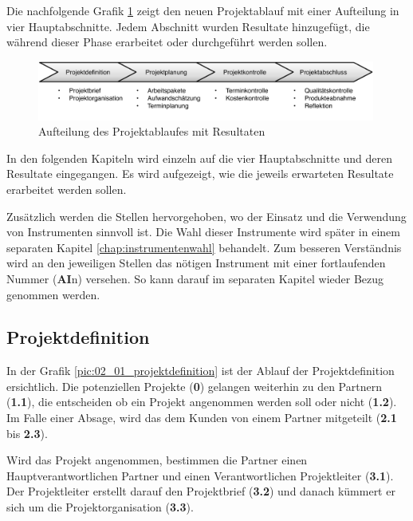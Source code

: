 Die nachfolgende Grafik \ref{pic:01_projektablauf} zeigt den neuen Projektablauf 
mit einer Aufteilung in vier Hauptabschnitte. Jedem Abschnitt wurden Resultate
hinzugefügt, die während dieser Phase erarbeitet oder durchgeführt werden sollen.

\begin{figure}[htbp]
\begin{center}
\includegraphics[width=0.99\textwidth,angle=0]{./bilder/loesung/01_projektablauf.pdf}
\caption[Aufteilung des Projektablaufes mit Resultaten]{Aufteilung des Projektablaufes mit Resultaten\footnotemark}
\label{pic:01_projektablauf}
\end{center}
\end{figure}

In den folgenden Kapiteln wird einzeln auf die vier Hauptabschnitte und deren
Resultate eingegangen. Es wird aufgezeigt, wie die jeweils erwarteten Resultate 
erarbeitet werden sollen.

Zusätzlich werden die Stellen hervorgehoben, wo der Einsatz und die Verwendung 
von Instrumenten sinnvoll ist. Die Wahl dieser Instrumente wird später in einem
separaten Kapitel \ref{chap:instrumentenwahl} behandelt. Zum besseren Verständnis
wird an den jeweiligen Stellen das nötigen Instrument mit einer fortlaufenden
Nummer (\textbf{AI}n) versehen. So kann darauf im separaten Kapitel wieder Bezug 
genommen werden.

\subsection{Projektdefinition}
In der Grafik \ref{pic:02_01_projektdefinition} ist der Ablauf der Projektdefinition 
ersichtlich. Die potenziellen Projekte (\textbf{0}) gelangen weiterhin zu den
Partnern (\textbf{1.1}), die entscheiden ob ein Projekt angenommen werden soll
oder nicht (\textbf{1.2}). Im Falle einer Absage, wird das dem Kunden von einem
Partner mitgeteilt (\textbf{2.1} bis \textbf{2.3}).

Wird das Projekt angenommen, bestimmen die Partner einen Hauptverantwortlichen
Partner und einen Verantwortlichen Projektleiter (\textbf{3.1}). Der Projektleiter
erstellt darauf den Projektbrief (\textbf{3.2}) und danach kümmert er sich um
die Projektorganisation (\textbf{3.3}).

